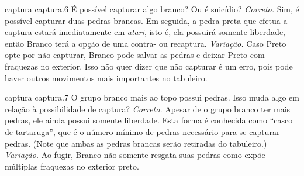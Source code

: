 \problemAnswerDiagram
  {captura}
  {captura.6}
  {É possível capturar algo branco? Ou é suicídio?}
  {\emph{Correto.} Sim, é possível capturar duas pedras brancas. Em seguida, a pedra preta que efetua a captura estará imediatamente em \emph{atari}, isto é, ela possuirá somente  liberdade, então Branco terá a opção de uma contra- ou recaptura.}
  {\emph{Variação.} Caso Preto opte por não capturar, Branco pode salvar as pedras e deixar Preto com fraquezas no exterior. Isso não quer dizer que não capturar é um erro, pois pode haver outros movimentos mais importantes no tabuleiro.}

\problemAnswerDiagram
  {captura}
  {captura.7}
  {O grupo branco mais ao topo possui  pedras. Isso muda algo em relação à possibilidade de captura?}
  {\emph{Correto.} Apesar de o grupo branco ter mais pedras, ele ainda possui somente  liberdade. Esta forma é conhecida como ``casco de tartaruga'', que é o número mínimo de pedras necessário para se capturar  pedras. (Note que ambas as pedras brancas serão retiradas do tabuleiro.)}
  {\emph{Variação.} Ao fugir, Branco não somente resgata suas pedras como expõe múltiplas fraquezas no exterior preto.}